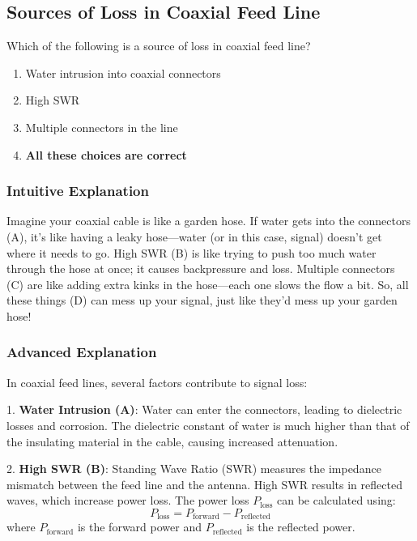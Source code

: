 \subsection{Sources of Loss in Coaxial Feed Line}
\label{T9B08}

\begin{tcolorbox}[colback=gray!10!white,colframe=black!75!black,title=T9B08]
Which of the following is a source of loss in coaxial feed line?
\begin{enumerate}[label=\Alph*)]
    \item Water intrusion into coaxial connectors
    \item High SWR
    \item Multiple connectors in the line
    \item \textbf{All these choices are correct}
\end{enumerate}
\end{tcolorbox}

\subsubsection{Intuitive Explanation}
Imagine your coaxial cable is like a garden hose. If water gets into the connectors (A), it’s like having a leaky hose—water (or in this case, signal) doesn’t get where it needs to go. High SWR (B) is like trying to push too much water through the hose at once; it causes backpressure and loss. Multiple connectors (C) are like adding extra kinks in the hose—each one slows the flow a bit. So, all these things (D) can mess up your signal, just like they’d mess up your garden hose!

\subsubsection{Advanced Explanation}
In coaxial feed lines, several factors contribute to signal loss:

1. \textbf{Water Intrusion (A)}: Water can enter the connectors, leading to dielectric losses and corrosion. The dielectric constant of water is much higher than that of the insulating material in the cable, causing increased attenuation.

2. \textbf{High SWR (B)}: Standing Wave Ratio (SWR) measures the impedance mismatch between the feed line and the antenna. High SWR results in reflected waves, which increase power loss. The power loss \( P_{\text{loss}} \) can be calculated using:
   \[
   P_{\text{loss}} = P_{\text{forward}} - P_{\text{reflected}}
   \]
   where \( P_{\text{forward}} \) is the forward power and \( P_{\text{reflected}} \) is the reflected power.

